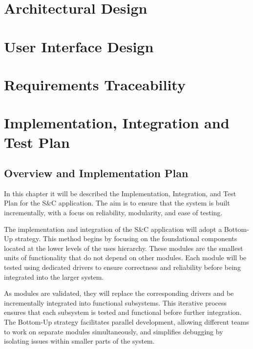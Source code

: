 \documentclass{Configuration_Files/PoliMi3i_thesis}
\begin{document}
    \chapter{Architectural Design}
    \label{ch:architectural_design}%
    


    \chapter{User Interface Design}
    \label{ch:ui_design}%
    


    \chapter{Requirements Traceability}
    \label{ch:requirements_traceability}%

    


    \chapter{Implementation, Integration and Test Plan}
    \label{ch:impl_int_test_plan}%
    

    \section{Overview and Implementation Plan}

In this chapter it will be described the Implementation, Integration, and Test Plan for the S\&C application. The aim is to ensure that the system is built incrementally, with a focus on reliability, modularity, and ease of testing.

The implementation and integration of the S\&C application will adopt a Bottom-Up strategy. This method begins by focusing on the foundational components located at the lower levels of the uses hierarchy. These modules are the smallest units of functionality that do not depend on other modules. Each module will be tested using dedicated drivers to ensure correctness and reliability before being integrated into the larger system.

As modules are validated, they will replace the corresponding drivers and be incrementally integrated into functional subsystems. This iterative process ensures that each subsystem is tested and functional before further integration. The Bottom-Up strategy facilitates parallel development, allowing different teams to work on separate modules simultaneously, and simplifies debugging by isolating issues within smaller parts of the system.
\end{document}
